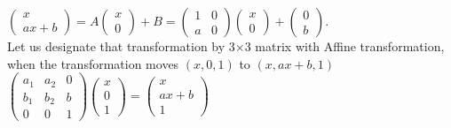\documentclass[11pt, oneside]{jsarticle} 	%
\begin{document}
$\begin{pmatrix}
 x\\
 ax+b
\end{pmatrix}=A\begin{pmatrix}
 x\\
 0
\end{pmatrix}+B=\begin{pmatrix}
 1 & 0\\
 a & 0
\end{pmatrix}\begin{pmatrix}
 x\\
 0
\end{pmatrix}+\begin{pmatrix}
 0\\
 b
\end{pmatrix}$.
\\
Let us designate that transformation by 3$\times$3 matrix with Affine transformation, \\when the transformation moves $(x,0,1)$ to $(x,ax+b,1)$\\
$\begin{pmatrix}
 a_1 & a_2 & 0\\
 b_1 & b_2 & b\\
 0 & 0 & 1
\end{pmatrix}\begin{pmatrix}
 x\\
 0\\
 1
\end{pmatrix} = \begin{pmatrix}
 x\\
 ax+b\\
 1
\end{pmatrix}$
\\ \\
\end{document}
